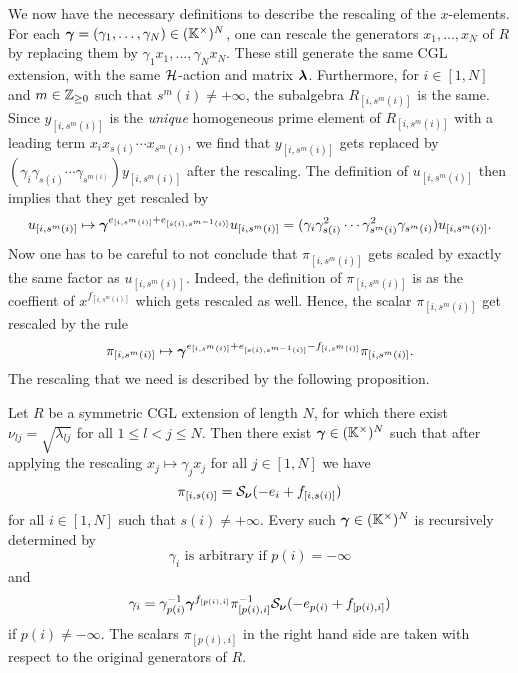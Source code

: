 We now have the necessary definitions to describe the rescaling of the $x$-elements.
For each $\boldsymbol{\gamma} = (\gamma_1, \dots, \gamma_N) \in (\mathbb{K}^\times)^N$, one can rescale the
generators $x_1, \dots, x_N$ of $R$ by replacing them by $\gamma_1 x_1, \dots, \gamma_N
	x_N$. These still generate the same CGL extension, with the same $\mathcal{H}$-action and
matrix $\boldsymbol{\lambda}$. Furthermore, for $i \in [1, N]$ and $m \in \mathbb{Z}_{\geq 0}$ such that
$s^m(i) \neq + \infty$, the subalgebra $R_{[i, s^m(i)]}$ is the same. Since $y_{[i,
					s^m(i)]}$ is the \emph{unique} homogeneous prime element of $R_{[i, s^m(i)]}$ with a
leading term $x_i x_{s(i)} \cdots x_{s^m(i)}$, we find that $y_{[i, s^m(i)]}$ gets
replaced by $(\gamma_i \gamma_{s(i)} \cdots \gamma_{s^{m(i)}})y_{[i, s^m(i)]}$ after
the rescaling. The definition of $u_{[i, s^m(i)]}$ then implies that they get rescaled
by
\begin{equation*}
	u_{[i, s^m(i)]} \mapsto \boldsymbol{\gamma}^{e_{[i, s^m(i)]} + e_{[s(i), s^{m-1}(i)]} }u_{[i, s^m(i)]} =  (\gamma_i \gamma_{s(i)}^2 \cdots \gamma_{s^m(i)}^2 \gamma_{s^m(i)})u_{[i, s^m(i)]}.
\end{equation*}
%
Now one has to be careful to not conclude that $\pi_{[i, s^m(i)]}$ gets scaled by
exactly the same factor as $u_{[i, s^m(i)]}$. Indeed, the definition of $\pi_{[i,
				s^m(i)]}$ is as the coeffient of $x^{f_{[i, s^m(i)]}}$ which gets rescaled as well.
Hence, the scalar $\pi_{[i, s^m(i)]}$ get rescaled by the rule
\begin{equation*}
	\pi_{[i, s^m(i)]} \mapsto \boldsymbol{\gamma}^{e_{[i, s^m(i)]}+e_{[s(i), s^{m-1}(i)]} - f_{[i, s^m(i)]}}\pi_{[i, s^m(i)]}.
\end{equation*}
%
The rescaling that we need is described by the following proposition.
\begin{proposition}

	Let $R$ be a symmetric CGL extension of length $N$, for which there exist $\nu_{lj} =
		\sqrt{\lambda_{lj}}$ for all $1 \leq l < j \leq N$. Then there exist $\boldsymbol{\gamma} \in
		(\mathbb{K}^\times)^N$ such that after applying the rescaling $x_j \mapsto \gamma_j x_j$ for
	all $j \in [1, N]$ we have
	\begin{equation}\label{eq:rescaling_conditions_for_pi}
		\pi_{[i, s(i)]} = \mathcal{S}_{\boldsymbol{\nu}}(-e_i + f_{[i, s(i)]})
	\end{equation}
	for all $i \in [1, N]$ such that $s(i) \neq + \infty$. Every such $\boldsymbol{\gamma} \in
		(\mathbb{K}^\times)^N$ is recursively determined by
	\begin{equation*}
		\gamma_i \text{ is arbitrary if } p(i) = -\infty
	\end{equation*}
	and
	\begin{equation*}
		\gamma_i = \gamma_{p(i)}^{-1} \boldsymbol{\gamma}^{f_{[p(i),i]}}\pi^{-1}_{[p(i), i]}\mathcal{S}_{\boldsymbol{\nu}}(-e_{p(i)} + f_{[p(i), i]})
	\end{equation*}
	if $p(i) \neq -\infty$. The scalars $\pi_{[p(i), i]}$ in the right hand side are taken with respect to the original generators of $R$.
\end{proposition}
